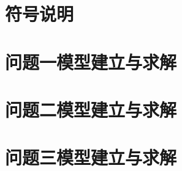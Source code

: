 \documentclass[withoutpreface,bwprint]{cumcmthesis} %
\begin{document}
\section{符号说明}

\section{问题一模型建立与求解}
%
%
%
%

\section{问题二模型建立与求解}

\section{问题三模型建立与求解}
\end{document}
